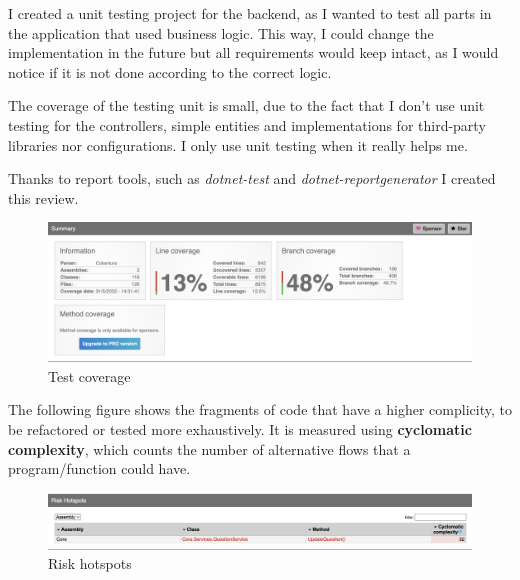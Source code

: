 I created a unit testing project for the backend, as I wanted to test all parts in the application that used business logic. 
This way, I could change the implementation in the future but all requirements would keep intact, as I would notice if it is not done according to the correct logic. 

The coverage of the testing unit is small, due to the fact that I don't use unit testing for the controllers, simple entities and implementations for 
third-party libraries nor configurations. I only use unit testing when it really helps me. 

Thanks to report tools, such as \textit{dotnet-test} and \textit{dotnet-reportgenerator} \cite{Coverage} I created this review.

\begin{figure}[H]
    \centering
        \includegraphics[width=\textwidth]{assets/coverage.png}
    \caption{Test coverage}
    \label{fig:test_coverage}
\end{figure}

The following figure shows the fragments of code that have a higher complicity, to be refactored or tested more exhaustively. 
It is measured using \textbf{cyclomatic complexity}, which counts the number of alternative flows that a program/function could have.
\begin{figure}[H]
    \centering
        \includegraphics[width=\textwidth]{assets/risk_hotpots.png}
    \caption{Risk hotspots}
    \label{fig:test_hotspots}
\end{figure}

